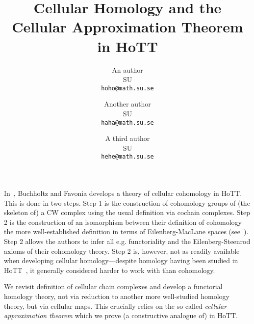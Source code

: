 \documentclass[a4page]{article}
\title{Cellular Homology and the Cellular Approximation Theorem in HoTT}
\author{
  An author\\
  \footnotesize{SU}\\
  \footnotesize{\texttt{hoho@math.su.se}}
  \and
  Another author\\
  \footnotesize{SU}\\
  \footnotesize{\texttt{haha@math.su.se}}
  \and
  A third author\\
  \footnotesize{SU}\\
  \footnotesize{\texttt{hehe@math.su.se}}
}
\date{}
\begin{document}
\maketitle

In~\cite{BuchholtzFavonia18}, Buchholtz and Favonia develops a theory
of cellular cohomology in HoTT. This is done in two steps. Step 1 is
the construction of cohomology groups of (the skeleton of) a CW
complex using the usual definition via cochain complexes.  Step 2 is
the construction of an isomorphism between their definition of
cohomology the more well-established definition in terms of
Eilenberg-MacLane spaces (see~\cite{LicataFinster14}). Step 2 allows
the authors to infer all e.g. functoriality and the Eilenberg-Steenrod
axioms of their cohomology theory. Step 2 is, however, not as readily
available when developing cellular homology---despite homology having
been studied in HoTT~\cite{graham18,christensen2020hurewicz}, it
generally considered harder to work with than cohomology. 

We revisit \cite{BuchholtzFavonia18} definition of cellular chain
complexes and develop a functorial homology theory, not via reduction
to another more well-studied homology theory, but via cellular
maps. This crucially relies on the so called \emph{cellular
  approximation theorem} which we prove (a constructive analogue of) in HoTT.
\end{document}
